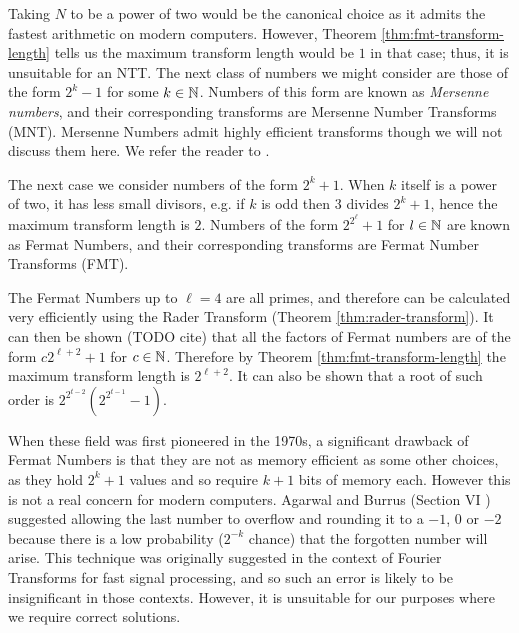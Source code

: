 Taking $N$ to be a power of two would be the canonical choice as it admits the fastest arithmetic on modern computers. However, Theorem \ref{thm:fmt-transform-length} tells us the maximum transform length would be $1$ in that case; thus, it is unsuitable for an NTT. The next class of numbers we might consider are those of the form $2^k - 1$ for some $k \in {\mathbb N}$. Numbers of this form are known as \textit{Mersenne numbers}, and their corresponding transforms are Mersenne Number Transforms (MNT). Mersenne Numbers admit highly efficient transforms though we will not discuss them here. We refer the reader to \cite{mersenne} \cite{mersenne-recent}.

The next case we consider numbers of the form $2^k + 1$. When $k$ itself is a power of two, it has less small divisors, e.g. if $k$ is odd then $3$ divides $2^k + 1$, hence the maximum transform length is $2$. Numbers of the form $2^{2^\ell} + 1$ for $l \in {\mathbb N}$ are known as Fermat Numbers, and their corresponding transforms are Fermat Number Transforms (FMT).

The Fermat Numbers up to $\ell = 4$ are all primes, and therefore can be calculated very efficiently using the Rader Transform (Theorem \ref{thm:rader-transform}). It can then be shown (TODO cite) that all the factors of Fermat numbers are of the form $c2^{\ell + 2} + 1$ for $c \in {\mathbb N}$. Therefore by Theorem \ref{thm:fmt-transform-length} the maximum transform length is $2^{\ell + 2}$. It can also be shown that a root of such order is $2^{2^{t-2}}(2^{2^{t-1}} - 1)$. 

\medskip

When these field was first pioneered in the 1970s, a significant drawback of Fermat Numbers is that they are not as memory efficient as some other choices, as they hold $2^k + 1$ values and so require $k + 1$ bits of memory each. However this is not a real concern for modern computers. Agarwal and Burrus (Section VI \cite{intro-to-fmt}) suggested allowing the last number to overflow and rounding it to a $-1$, $0$ or $-2$ because there is a low probability ($2^{-k}$ chance) that the forgotten number will arise. This technique was originally suggested in the context of Fourier Transforms for fast signal processing, and so such an error is likely to be insignificant in those contexts. However, it is unsuitable for our purposes where we require correct solutions.
